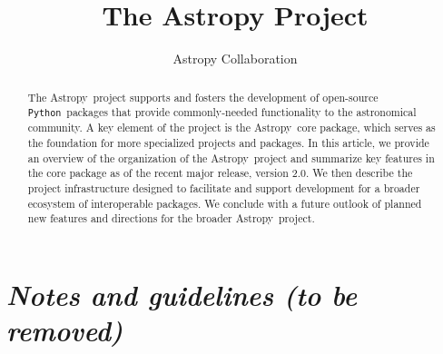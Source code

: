 \documentclass[modern]{aastex61}
\newcommand{\package}[1]{\texttt{#1}}
\newcommand{\python}{\package{Python}}
\newcommand{\astropy}{Astropy}
\begin{document}
\draft{\today}

\title{The Astropy Project}


\author{Astropy Collaboration}

\begin{abstract}
The \astropy\ project supports and fosters the development of open-source
\python\ packages that provide commonly-needed functionality to the astronomical
community.
A key element of the project is the \astropy\ core package, which serves as the
foundation for more specialized projects and packages.
In this article, we provide an overview of the organization of the \astropy\
project and summarize key features in the core package as of the recent major
release, version 2.0.
We then describe the project infrastructure designed to facilitate and support
development for a broader ecosystem of interoperable packages.
We conclude with a future outlook of planned new features and directions for the
broader \astropy\ project.
\end{abstract}

\keywords{}

\section*{\textit{Notes and guidelines (to be removed)}}
\end{document}

